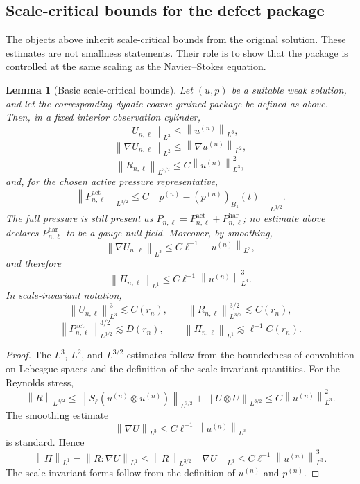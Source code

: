 \documentclass[11pt]{article}
\numberwithin{equation}{section}
\theoremstyle{plain}
\newtheorem{lemma}[theorem]{Lemma}
\theoremstyle{definition}
\theoremstyle{remark}
\newcommand{\har}{\mathrm{har}}
\newcommand{\norm}[2]{\left\|#1\right\|_{#2}}
\newcommand{\act}{\mathrm{act}}
\begin{document}
\subsection{Scale-critical bounds for the defect package}

The objects above inherit scale-critical bounds from the original solution.  These estimates are not smallness statements.  Their role is to show that the package is controlled at the same scaling as the Navier--Stokes equation.

\begin{lemma}[Basic scale-critical bounds]
Let \((u,p)\) be a suitable weak solution, and let the corresponding dyadic coarse-grained package be defined as above.  Then, in a fixed interior observation cylinder,
\[
  \norm{U_{n,\ell}}{L^3}
  \le
  \norm{u^{(n)}}{L^3},
\]
\[
  \norm{\nabla U_{n,\ell}}{L^2}
  \le
  \norm{\nabla u^{(n)}}{L^2},
\]
\[
  \norm{R_{n,\ell}}{L^{3/2}}
  \le
  C\norm{u^{(n)}}{L^3}^2,
\]
and, for the chosen active pressure representative,
\[
  \norm{P^{\act}_{n,\ell}}{L^{3/2}}
  \le
  C\norm{p^{(n)}-(p^{(n)})_{B_1}(t)}{L^{3/2}}.
\]
The full pressure is still present as \(P_{n,\ell}=P^{\act}_{n,\ell}+P^{\har}_{n,\ell}\); no estimate above declares \(P^{\har}_{n,\ell}\) to be a gauge-null field.  Moreover, by smoothing,
\[
  \norm{\nabla U_{n,\ell}}{L^3}
  \le
  C\ell^{-1}\norm{u^{(n)}}{L^3},
\]
and therefore
\[
  \norm{\Pi_{n,\ell}}{L^1}
  \le
  C\ell^{-1}\norm{u^{(n)}}{L^3}^3.
\]
In scale-invariant notation,
\[
  \norm{U_{n,\ell}}{L^3}^3\lesssim C(r_n),
  \qquad
  \norm{R_{n,\ell}}{L^{3/2}}^{3/2}\lesssim C(r_n),
\]
\[
  \norm{P^{\act}_{n,\ell}}{L^{3/2}}^{3/2}\lesssim D(r_n),
  \qquad
  \norm{\Pi_{n,\ell}}{L^1}\lesssim \ell^{-1}C(r_n).
\]
\end{lemma}

\begin{proof}
The \(L^3\), \(L^2\), and \(L^{3/2}\) estimates follow from the boundedness of convolution on Lebesgue spaces and the definition of the scale-invariant quantities.  For the Reynolds stress,
\[
  \norm{R}{L^{3/2}}
  \le
  \norm{S_\ell(u^{(n)}\otimes u^{(n)})}{L^{3/2}}
  +
  \norm{U\otimes U}{L^{3/2}}
  \le
  C\norm{u^{(n)}}{L^3}^2.
\]
The smoothing estimate
\[
  \norm{\nabla U}{L^3}\le C\ell^{-1}\norm{u^{(n)}}{L^3}
\]
is standard.  Hence
\[
  \norm{\Pi}{L^1}
  =
  \norm{R:\nabla U}{L^1}
  \le
  \norm{R}{L^{3/2}}\norm{\nabla U}{L^3}
  \le
  C\ell^{-1}\norm{u^{(n)}}{L^3}^3.
\]
The scale-invariant forms follow from the definition of \(u^{(n)}\) and \(p^{(n)}\).
\end{proof}
\end{document}
